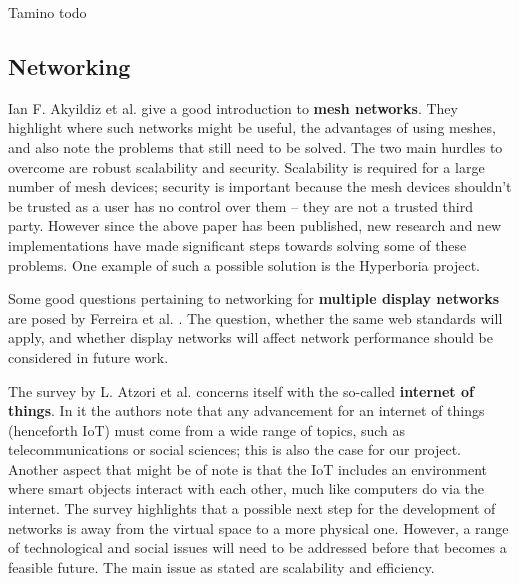 Tamino todo

\subsection{Networking}

Ian F. Akyildiz et al. \cite{akyildiz2005survey} give a good introduction to \textbf{mesh networks}.
They highlight where such networks might be useful, the advantages of using meshes, and also note the problems that still need to be solved.
The two main hurdles to overcome are robust scalability and security.
Scalability is required for a large number of mesh devices; security is important because the mesh devices shouldn't be trusted as a user has no control over them – they are not a trusted third party.
However since the above paper has been published, new research and new implementations have made significant steps towards solving some of these problems.
One example of such a possible solution is the Hyperboria \cite{hyperboria} project.

Some good questions pertaining to networking for \textbf{multiple display networks} are posed by Ferreira et al. \cite{ferreira2012scalability}.
The question, whether the same web standards will apply, and whether display networks will affect network performance should be considered in future work.

The survey by L. Atzori et al. \cite{atzori2010internet} concerns itself with the so-called \textbf{internet of things}.
In it the authors note that any advancement for an internet of things (henceforth IoT) must come from a wide range of topics, such as telecommunications or social sciences; this is also the case for our project.
Another aspect that might be of note is that the IoT includes an environment where smart objects interact with each other, much like computers do via the internet.
The survey highlights that a possible next step for the development of networks is away from the virtual space to a more physical one.
However, a range of technological and social issues will need to be addressed before that becomes a feasible future.
The main issue as stated are scalability and efficiency.
